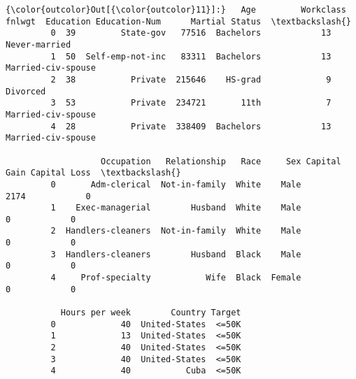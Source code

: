 \documentclass{report}
\begin{document}
\begin{Verbatim}[commandchars=\\\{\}]
{\color{outcolor}Out[{\color{outcolor}11}]:}   Age         Workclass  fnlwgt  Education Education-Num      Martial Status  \textbackslash{}
         0  39         State-gov   77516  Bachelors            13       Never-married   
         1  50  Self-emp-not-inc   83311  Bachelors            13  Married-civ-spouse   
         2  38           Private  215646    HS-grad             9            Divorced   
         3  53           Private  234721       11th             7  Married-civ-spouse   
         4  28           Private  338409  Bachelors            13  Married-civ-spouse   
         
                   Occupation   Relationship   Race     Sex Capital Gain Capital Loss  \textbackslash{}
         0       Adm-clerical  Not-in-family  White    Male         2174            0   
         1    Exec-managerial        Husband  White    Male            0            0   
         2  Handlers-cleaners  Not-in-family  White    Male            0            0   
         3  Handlers-cleaners        Husband  Black    Male            0            0   
         4     Prof-specialty           Wife  Black  Female            0            0   
         
           Hours per week        Country Target  
         0             40  United-States  <=50K  
         1             13  United-States  <=50K  
         2             40  United-States  <=50K  
         3             40  United-States  <=50K  
         4             40           Cuba  <=50K  
\end{Verbatim}
            

    
    
    
    
\end{document}
